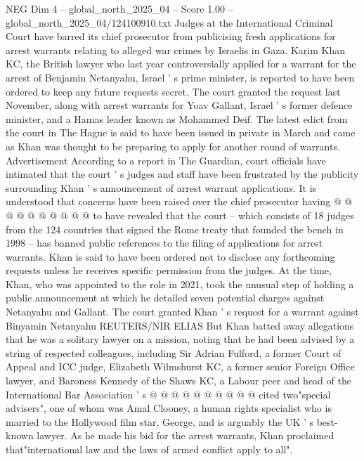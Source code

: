 \begin{textsample}{NEG Dim 4 – global\_north\_2025\_04 – Score 1.00 – global\_north\_2025\_04/124100910.txt}  \label{ex:f4_neg_240}
Judges at the International Criminal Court have barred its chief prosecutor from publicising fresh applications for arrest warrants relating to alleged war crimes by Israelis in Gaza.
Karim Khan KC, the British lawyer who last year controversially applied for a warrant for the arrest of Benjamin Netanyahu, Israel ' s prime minister, is reported to have been ordered to keep any future requests secret.
The court granted the request last November, along with arrest warrants for Yoav Gallant, Israel ' s former defence minister, and a Hamas leader known as Mohammed Deif.
The latest edict from the court in The Hague is said to have been issued in private in March and came as Khan was thought to be preparing to apply for another round of warrants.
Advertisement According to a report in The Guardian, court officials have intimated that the court ' s judges and staff have been frustrated by the publicity surrounding Khan ' s announcement of arrest warrant applications.
It is understood that concerns have been raised over the chief prosecutor having @ @ @ @ @ @ @ @ @ @ to have revealed that the court -- which consists of 18 judges from the 124 countries that signed the Rome treaty that founded the bench in 1998 -- has banned public references to the filing of applications for arrest warrants.
Khan is said to have been ordered not to disclose any forthcoming requests unless he receives specific permission from the judges.
At the time, Khan, who was appointed to the role in 2021, took the unusual step of holding a public announcement at which he detailed seven potential charges against Netanyahu and Gallant.
The court granted Khan ' s request for a warrant against Binyamin Netanyahu REUTERS/NIR ELIAS But Khan batted away allegations that he was a solitary lawyer on a mission, noting that he had been advised by a string of respected colleagues, including Sir Adrian Fulford, a former Court of Appeal and ICC judge, Elizabeth Wilmshurst KC, a former senior Foreign Office lawyer, and Baroness Kennedy of the Shaws KC, a Labour peer and head of the International Bar Association ' s @ @ @ @ @ @ @ @ @ @ cited two"special advisers", one of whom was Amal Clooney, a human rights specialist who is married to the Hollywood film star, George, and is arguably the UK ' s best-known lawyer.
As he made his bid for the arrest warrants, Khan proclaimed that"international law and the laws of armed conflict apply to all".

\end{textsample}
